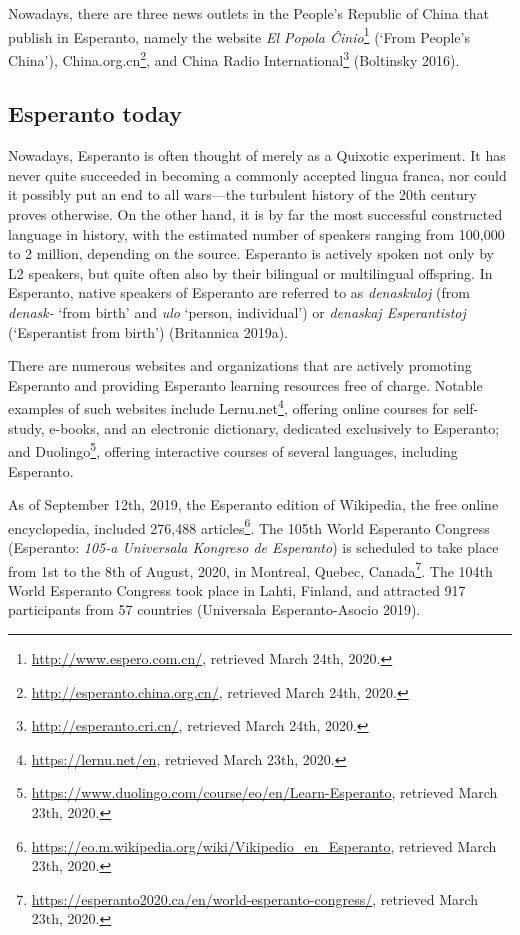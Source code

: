 Nowadays, there are three news outlets in the People's Republic of China that publish in Esperanto, namely the website \textit{El Popola Ĉinio}\footnote{\url{http://www.espero.com.cn/}, retrieved March 24th, 2020.} (`From People's China'), China.org.cn\footnote{\url{http://esperanto.china.org.cn/}, retrieved March 24th, 2020.},
and China Radio International\footnote{\url{http://esperanto.cri.cn/}, retrieved March 24th, 2020.}
(Boltinsky 2016).

\subsection{Esperanto today}
Nowadays, Esperanto is often thought of merely as a Quixotic experiment.
It has never quite succeeded in becoming a commonly accepted lingua franca, nor could it possibly put an end to all wars---the turbulent history of the 20th century proves otherwise.
On the other hand, it is by far the most successful constructed language in history, with the estimated number of speakers ranging from 100,000 to 2 million, depending on the source.
Esperanto is actively spoken not only by L2 speakers, but quite often also by their bilingual or multilingual offspring.
In Esperanto, native speakers of Esperanto are referred to as \textit{denaskuloj} (from \textit{denask-} `from birth' and \textit{ulo} `person, individual') or \textit{denaskaj Esperantistoj} (`Esperantist from birth')
(Britannica 2019a).

There are numerous websites and organizations that are actively promoting Esperanto and providing Esperanto learning resources free of charge.
Notable examples of such websites include Lernu.net\footnote{\url{https://lernu.net/en}, retrieved March 23th, 2020.}, offering online courses for self-study, e-books, and an electronic dictionary, dedicated exclusively to Esperanto; and Duolingo\footnote{\url{https://www.duolingo.com/course/eo/en/Learn-Esperanto}, retrieved March 23th, 2020.}, offering interactive courses of several languages, including Esperanto.

As of September 12th, 2019, the Esperanto edition of Wikipedia, the free online encyclopedia, included 276,488 articles\footnote{\url{https://eo.m.wikipedia.org/wiki/Vikipedio_en_Esperanto}, retrieved March 23th, 2020.}.
The 105th World Esperanto Congress (Esperanto: \textit{105-a Universala Kongreso de Esperanto}) is scheduled to take place from 1st to the 8th of August, 2020, in Montreal, Quebec, Canada\footnote{\url{https://esperanto2020.ca/en/world-esperanto-congress/}, retrieved March 23th, 2020.}.
The 104th World Esperanto Congress took place in Lahti, Finland, and attracted 917 participants from 57 countries (Universala Esperanto-Asocio 2019).

